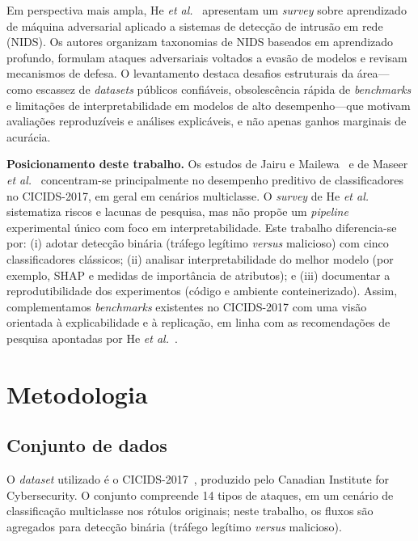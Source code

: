 \documentclass[12pt]{article}
\makeatletter
\newlength{\sbcblockmargin}
\newenvironment{sbcnarrowblock}{%
  \list{}{%
    \topsep\z@
    \partopsep\z@
    \itemsep\z@
    \parsep\z@
    \leftmargin=\sbcblockmargin
    \rightmargin=\sbcblockmargin
    \listparindent=\parindent
    \itemindent=\z@
    \labelwidth=\z@
    \labelsep=\z@
  }\item\relax}
{\endlist}
\makeatother
\begin{document}
\begin{sbcnarrowblock}
Em perspectiva mais ampla, He \textit{et al.}~\cite{he2023adversarial} apresentam um \textit{survey} sobre aprendizado de máquina adversarial aplicado a sistemas de detecção de intrusão em rede (NIDS).
Os autores organizam taxonomias de NIDS baseados em aprendizado profundo, formulam ataques adversariais voltados a evasão de modelos e revisam mecanismos de defesa.
O levantamento destaca desafios estruturais da área---como escassez de \textit{datasets} públicos confiáveis, obsolescência rápida de \textit{benchmarks} e limitações de interpretabilidade em modelos de alto desempenho---que motivam avaliações reproduzíveis e análises explicáveis, e não apenas ganhos marginais de acurácia.

\textbf{Posicionamento deste trabalho.}
Os estudos de Jairu e Mailewa~\cite{jairu2022network} e de Maseer \textit{et al.}~\cite{maseer2021benchmarking} concentram-se principalmente no desempenho preditivo de classificadores no CICIDS-2017, em geral em cenários multiclasse.
O \textit{survey} de He \textit{et al.}~\cite{he2023adversarial} sistematiza riscos e lacunas de pesquisa, mas não propõe um \textit{pipeline} experimental único com foco em interpretabilidade.
Este trabalho diferencia-se por: (i) adotar detecção binária (tráfego legítimo \textit{versus} malicioso) com cinco classificadores clássicos; (ii) analisar interpretabilidade do melhor modelo (por exemplo, SHAP e medidas de importância de atributos); e (iii) documentar a reprodutibilidade dos experimentos (código e ambiente conteinerizado).
Assim, complementamos \textit{benchmarks} existentes no CICIDS-2017 com uma visão orientada à explicabilidade e à replicação, em linha com as recomendações de pesquisa apontadas por He \textit{et al.}~\cite{he2023adversarial}.

\section{Metodologia}
\label{sec:methodology}

\subsection{Conjunto de dados}
O \textit{dataset} utilizado é o CICIDS-2017~\cite{sharafaldin2018toward}, 
produzido pelo Canadian Institute for Cybersecurity.
O conjunto compreende 14 tipos de ataques, em um cenário de classificação multiclasse 
nos rótulos originais; neste trabalho, os fluxos são agregados para detecção binária 
(tráfego legítimo \textit{versus} malicioso).


\end{sbcnarrowblock}
\end{document}
